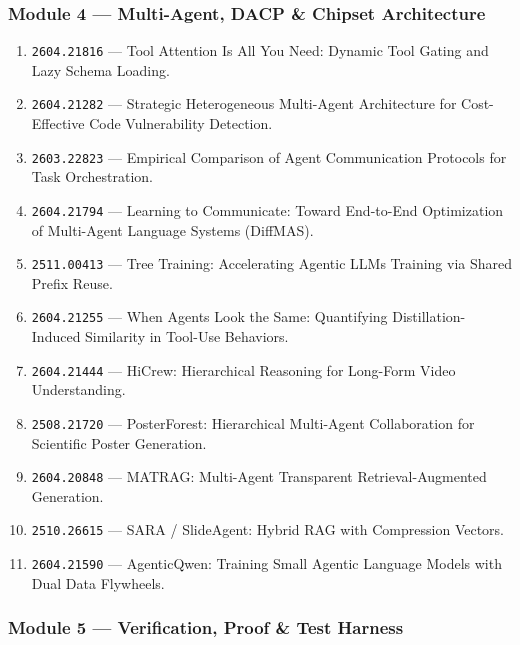 \documentclass[11pt,letterpaper]{article}
\newcommand{\arxivid}[1]{\texttt{\textcolor{accent}{#1}}}
\begin{document}
\subsubsection{Module 4 --- Multi-Agent, DACP \& Chipset Architecture}

\begin{enumerate}[leftmargin=*]
\item \arxivid{2604.21816} --- Tool Attention Is All You Need: Dynamic Tool Gating and Lazy Schema Loading.
\item \arxivid{2604.21282} --- Strategic Heterogeneous Multi-Agent Architecture for Cost-Effective Code Vulnerability Detection.
\item \arxivid{2603.22823} --- Empirical Comparison of Agent Communication Protocols for Task Orchestration.
\item \arxivid{2604.21794} --- Learning to Communicate: Toward End-to-End Optimization of Multi-Agent Language Systems (DiffMAS).
\item \arxivid{2511.00413} --- Tree Training: Accelerating Agentic LLMs Training via Shared Prefix Reuse.
\item \arxivid{2604.21255} --- When Agents Look the Same: Quantifying Distillation-Induced Similarity in Tool-Use Behaviors.
\item \arxivid{2604.21444} --- HiCrew: Hierarchical Reasoning for Long-Form Video Understanding.
\item \arxivid{2508.21720} --- PosterForest: Hierarchical Multi-Agent Collaboration for Scientific Poster Generation.
\item \arxivid{2604.20848} --- MATRAG: Multi-Agent Transparent Retrieval-Augmented Generation.
\item \arxivid{2510.26615} --- SARA / SlideAgent: Hybrid RAG with Compression Vectors.
\item \arxivid{2604.21590} --- AgenticQwen: Training Small Agentic Language Models with Dual Data Flywheels.
\end{enumerate}

\subsubsection{Module 5 --- Verification, Proof \& Test Harness}
\end{document}
